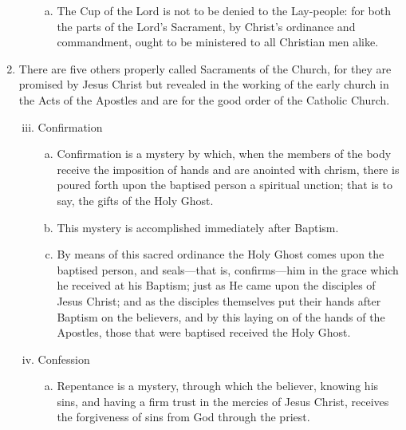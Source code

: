 \begin{enumerate}
\begin{enumerate}[i.]
\begin{enumerate}[a.]
				\item The Cup of the Lord is not to be denied to the Lay-people: for both the parts of the Lord's Sacrament, by Christ's ordinance and commandment, ought to be ministered to all Christian men alike.
			\end{enumerate}
	\end{enumerate}
	\item There are five others properly called Sacraments of the Church, for they are promised by Jesus Christ but revealed in the working of the early church in the Acts of the Apostles and are for the good order of the Catholic Church.
	\begin{enumerate}[i.]
	\setcounter{enumii}{2}
		\item Confirmation
			\begin{enumerate}[a.]
				\item Confirmation is a mystery by which, when the members of the body receive the imposition of hands and are anointed with chrism, there is poured forth upon the baptised person a spiritual unction; that is to say, the gifts of the Holy Ghost.
				\item This mystery is accomplished immediately after Baptism.
				\item By means of this sacred ordinance the Holy Ghost comes upon the baptised person, and seals---that is, confirms---him in the grace which he received at his Baptism; just as He came upon the disciples of Jesus Christ; and as the disciples themselves put their hands after Baptism on the believers, and by this laying on of the hands of the Apostles, those that were baptised received the Holy Ghost.
			\end{enumerate}
		\item Confession
			\begin{enumerate}[a.]
				\item Repentance is a mystery, through which the believer, knowing his sins, and having a firm trust in the mercies of Jesus Christ, receives the forgiveness of sins from God through the priest.

\end{enumerate}
\end{enumerate}
\end{enumerate}
